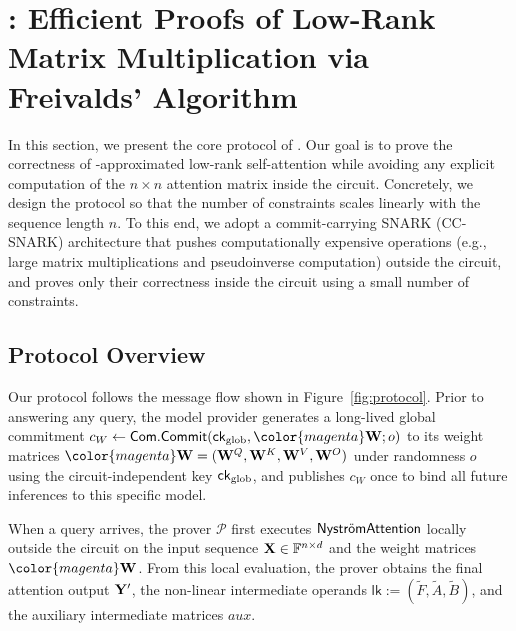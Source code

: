 \documentclass[sigconf,anonymous,review,balance=false]{acmart}
\newcommand{\rev}[1]{{\color{magenta}#1}}
\begin{document}
\section{\name: Efficient Proofs of Low-Rank Matrix Multiplication via Freivalds' Algorithm}
\label{sec:protocol}

In this section, we present the core protocol of \name. Our goal is to prove the correctness of \nystrom-approximated low-rank self-attention while avoiding any explicit computation of the $n \times n$ attention matrix inside the circuit. Concretely, we design the protocol so that the number of constraints scales linearly with the sequence length $n$. To this end, we adopt a commit-carrying SNARK (CC-SNARK) architecture that pushes computationally expensive operations (e.g., large matrix multiplications and pseudoinverse computation) outside the circuit, and proves only their correctness inside the circuit using a small number of constraints.


\subsection{Protocol Overview}
Our protocol follows the message flow shown in Figure~\ref{fig:protocol}.
Prior to answering any query, the model provider generates a long-lived global commitment $c_W \gets \Com.\commit(\ck_{\mathrm{glob}}, \rev{\W}; o)$ to its weight matrices $\rev{\W = (\W^Q, \W^K, \W^V, \W^O)}$ under randomness $o$ using the circuit-independent key ${\sf ck}_{\mathrm{glob}}$, and publishes $c_W$ once to bind all future inferences to this specific model.

When a query arrives, the prover $\mathcal{P}$ first executes $\textsf{Nystr\"omAttention}$ locally outside the circuit on the input sequence ${\mathbf{X}} \in \mathbb{F}^{n \times d}$ and the weight matrices $\rev{\W}$.
From this local evaluation, the prover obtains the final attention output ${\mathbf{Y}}'$, the non-linear intermediate operands $\mathsf{lk} := (\tilde{F}, \tilde{A}, \tilde{B})$, and the auxiliary intermediate matrices $\textit{aux}$.
\end{document}
